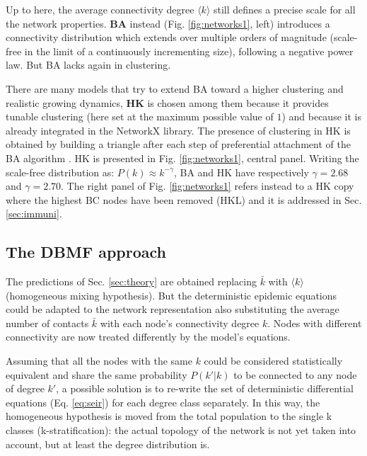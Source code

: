 \documentclass[DIV=12, BCOR=0pt]{scrartcl}  %
\begin{document}
  
  Up to here, the average connectivity degree $\langle k \rangle$ still defines a precise scale for all the network properties. \textbf{BA} instead (Fig. \ref{fig:networks1}, left) introduces a connectivity distribution which extends over multiple orders of magnitude (scale-free in the limit of a continuously incrementing size), following a negative power law. But BA lacks again in clustering. 
 
  There are many models that try to extend BA toward a higher clustering and realistic growing dynamics, \textbf{HK} is chosen among them because it provides tunable clustering (here set at the maximum possible value of $1$) and because it is already integrated in the NetworkX library. The presence of clustering in HK is obtained by building a triangle after each step of preferential attachment of the BA algorithm \citep{Holme}.
  HK is presented in Fig. \ref{fig:networks1}, central panel. Writing the scale-free distribution as: $P(k) \approx k^{- \gamma}$, BA and HK have respectively $\gamma = 2.68$ and $\gamma = 2.70$.
  The right panel of Fig. \ref{fig:networks1} refers instead to a HK copy where the highest BC nodes have been removed (HKL) and it is addressed in Sec. \ref{sec:immuni}.
  
  
  \subsection{The DBMF approach} 
  The predictions of Sec. \ref{sec:theory} are obtained replacing $\bar{k}$ with $\langle k \rangle$ (homogeneous mixing hypothesis). But the deterministic epidemic equations could be adapted to the network representation also substituting the average number of contacts $\bar{k}$ with each node's connectivity degree $k$. Nodes with different connectivity are now treated differently by the model's equations.
  
  Assuming that all the nodes with the same $k$ could be considered statistically equivalent and share the same probability $P(k'|k)$ to be connected to any node of degree $k'$, a possible solution is to re-write the set of deterministic differential equations (Eq. \ref{eq:seir}) for each degree class separately.
  In this way, the homogeneous hypothesis is moved from the total population to the single k classes (k-stratification): the actual topology of the network is not yet taken into account, but at least the degree distribution is. 
  
\end{document}
